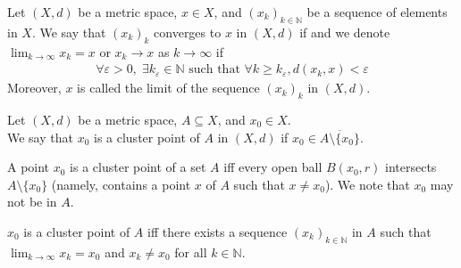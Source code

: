 \documentclass{tufte-handout}
\begin{document}
\begin{Definition}
    Let \((X, d)\) be a metric space, \( x \in X \), and \( (x_k)_{k\in \mathbb{N}} \) be
    a sequence of elements in \( X \). 
    We say that \((x_k)_k\) converges to \( x \) in \( (X, d) \) if
    and we denote \(\lim_{k\to\infty}x_k = x\) or \( x_k \to x \) as \( k \to \infty \) if
    \begin{align}
        \forall \varepsilon > 0, \; \exists k_\varepsilon \in \mathbb{N} \text{ such that } 
        \forall k \geq k_\varepsilon, d(x_k, x) < \varepsilon
    \end{align}
    Moreover, \( x \) is called the limit of the sequence \( (x_k)_k \) in \( (X, d) \).
\end{Definition}

\begin{Definition}
    \hfill \newline
    Let \( (X, d) \) be a metric space, \( A \subseteq X \), and \( x_0 \in X \).\\ 
    We say that \( x_0 \) is a cluster point of \( A \) in \( (X, d) \) if 
    \( x_0 \in \overline{A\setminus \{x_0\}} \).
\end{Definition}

\begin{Proposition}
    A point \( x_0 \) is a cluster point of a set \( A \) iff every open ball \( B(x_0, r) \) intersects \( A \setminus \{x_0\} \)
    (namely, contains a point \( x \) of \( A \) such that \( x \neq x_0 \)).
    We note that \( x_0 \) may not be in \( A \).
\end{Proposition}

\begin{Proposition}
    \hfill\newline
    \( x_0 \) is a cluster point of \( A \) iff there exists a sequence 
    \( (x_k)_{k\in \mathbb{N}} \) in \( A \) such that 
    \(\lim_{k\to \infty} x_k = x_0\) and \( x_k \neq x_0 \) for all \( k \in \mathbb{N} \).
\end{Proposition}
\end{document}
